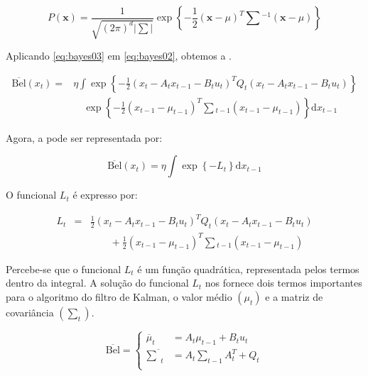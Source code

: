 \begin{equation}
    \label{eq:bayes03}
    P(\mathbf{x}) = \frac{1}{\sqrt{(2\pi)^{d}|\sum|}}\exp\left\{-\frac{1}{2} (\mathbf{x}-\mu)^T\textstyle\sum{}^{-1}(\mathbf{x}-\mu)\right\}
\end{equation}        

Aplicando \ref{eq:bayes03} em \ref{eq:bayes02}, obtemos a .

\begin{equation}
    \begin{matrix}
        \label{eq:bayes04}
        \overline{\text{Bel}}(x_t)= &  \eta \displaystyle\int \exp\left\{  -\frac{1}{2} \left(x_t - A_t x_{t-1} - B_t u_t\right)^T Q_t \left(x_t - A_t x_{t-1} - B_t u_t\right)  \right\} \\
        & \quad\exp\left\{ -\displaystyle\frac{1}{2} \left(x_{t-1} - \mu_{t-1}\right)^T \textstyle\sum {}_{t-1} \left(x_{t-1} - \mu_{t-1}\right)  \right\}\text{d}x_{t-1}
    \end{matrix}
\end{equation}

Agora, a  pode ser representada por:

\begin{equation}
    \overline{\text{Bel}}(x_t)= \eta \displaystyle\int \exp\left\{ -L_t \right\}\text{d}x_{t-1}
\end{equation}

O funcional $L_t$ é expresso por:

\begin{equation}
    \begin{matrix}
        L_t&  = & \displaystyle\frac{1}{2} \left(x_t - A_t x_{t-1} - B_t u_t\right)^T Q_t \left(x_t - A_t x_{t-1} - B_t u_t\right) \\
        & & \quad\quad + \displaystyle\frac{1}{2} \left(x_{t-1} - \mu_{t-1}\right)^T \textstyle\sum {}_{t-1} \left(x_{t-1} - \mu_{t-1}\right)
    \end{matrix}
\end{equation}

Percebe-se que o funcional $L_t$ é um função quadrática, representada pelos termos dentro da integral. A solução do funcional $L_t$ nos fornece dois termos importantes para o algoritmo do filtro de Kalman, o valor médio $\left(\mu_t\right)$ e a matriz de covariância $\left(\sum_t\right)$.

\begin{equation}
    \label{eq:bayes05}
    \overline{\text{Bel}} = 
    \left\{
    \begin{aligned}
            \overline{\mu}_t & = A_t\mu_{t-1} + B_t u_t\\
            \overline{\textstyle\sum}_t & = A_t {\textstyle\sum}_{t-1} A_t^T+ Q_t\\
    \end{aligned} \right.
\end{equation}

